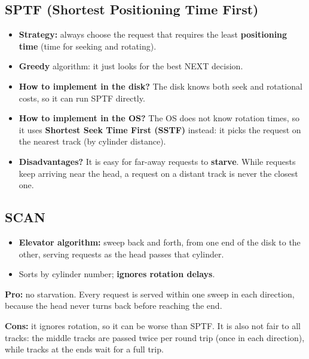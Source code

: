 \documentclass[11pt,a4paper]{article}
\begin{document}
\subsection{SPTF (Shortest Positioning Time First)}

\begin{itemize}
  \item \textbf{Strategy:} always choose the request that requires the least
        \textbf{positioning time} (time for seeking and rotating).
  \item \textbf{Greedy} algorithm: it just looks for the best NEXT decision.
  \item \textbf{How to implement in the disk?} The disk knows both seek and
        rotational costs, so it can run SPTF directly.
  \item \textbf{How to implement in the OS?} The OS does not know rotation
        times, so it uses \textbf{Shortest Seek Time First (SSTF)} instead:
        it picks the request on the nearest track (by cylinder distance).
  \item \textbf{Disadvantages?} It is easy for far-away requests to
        \textbf{starve}. While requests keep arriving near the head, a
        request on a distant track is never the closest one.
\end{itemize}

\subsection{SCAN}

\begin{itemize}
  \item \textbf{Elevator algorithm:} sweep back and forth, from one end of
        the disk to the other, serving requests as the head passes that
        cylinder.
  \item Sorts by cylinder number; \textbf{ignores rotation delays}.
\end{itemize}

\begin{quizbox}
\textbf{Pro:} no starvation. Every request is served within one sweep in
each direction, because the head never turns back before reaching the end.

\textbf{Cons:} it ignores rotation, so it can be worse than SPTF. It is also
not fair to all tracks: the middle tracks are passed twice per round trip
(once in each direction), while tracks at the ends wait for a full trip.
\end{quizbox}
\end{document}
